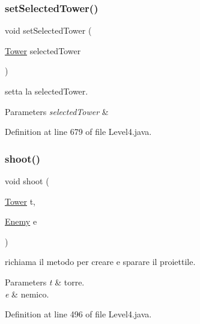 \subsubsection{\texorpdfstring{set\+Selected\+Tower()}{setSelectedTower()}}
{\footnotesize\ttfamily void set\+Selected\+Tower (\begin{DoxyParamCaption}\item[{\hyperlink{classtowers_1_1_tower}{Tower}}]{selected\+Tower }\end{DoxyParamCaption})}



setta la selected\+Tower. 


\begin{DoxyParams}{Parameters}
{\em selected\+Tower} & \\
\hline
\end{DoxyParams}


Definition at line 679 of file Level4.\+java.

\mbox{\label{classscenes_1_1_level4_a200b073564fc341f34b6112718742bae}} 
\subsubsection{\texorpdfstring{shoot()}{shoot()}}
{\footnotesize\ttfamily void shoot (\begin{DoxyParamCaption}\item[{\hyperlink{classtowers_1_1_tower}{Tower}}]{t,  }\item[{\hyperlink{classenemies_1_1_enemy}{Enemy}}]{e }\end{DoxyParamCaption})}



richiama il metodo per creare e sparare il proiettile. 


\begin{DoxyParams}{Parameters}
{\em t} & torre. \\
\hline
{\em e} & nemico. \\
\hline
\end{DoxyParams}


Definition at line 496 of file Level4.\+java.

